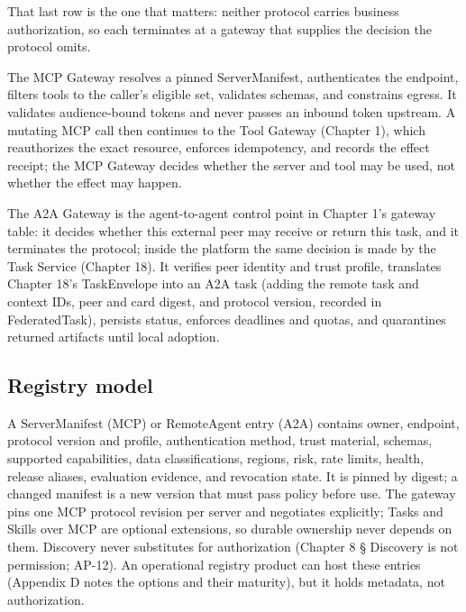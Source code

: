 That last row is the one that matters: neither protocol carries business authorization, so each terminates at a gateway that supplies the decision the protocol omits.\par

The MCP Gateway resolves a pinned ServerManifest, authenticates the endpoint, filters tools to the caller's eligible set, validates schemas, and constrains egress. It validates audience-bound tokens and never passes an inbound token upstream. A mutating MCP call then continues to the Tool Gateway (Chapter 1), which reauthorizes the exact resource, enforces idempotency, and records the effect receipt; the MCP Gateway decides whether the server and tool may be used, not whether the effect may happen.\par

The A2A Gateway is the agent-to-agent control point in Chapter 1's gateway table: it decides whether this external peer may receive or return this task, and it terminates the protocol; inside the platform the same decision is made by the Task Service (Chapter 18). It verifies peer identity and trust profile, translates Chapter 18's TaskEnvelope into an A2A task (adding the remote task and context IDs, peer and card digest, and protocol version, recorded in FederatedTask), persists status, enforces deadlines and quotas, and quarantines returned artifacts until local adoption.\par

\subsection{Registry model}

A ServerManifest (MCP) or RemoteAgent entry (A2A) contains owner, endpoint, protocol version and profile, authentication method, trust material, schemas, supported capabilities, data classifications, regions, risk, rate limits, health, release aliases, evaluation evidence, and revocation state. It is pinned by digest; a changed manifest is a new version that must pass policy before use. The gateway pins one MCP protocol revision per server and negotiates explicitly; Tasks and Skills over MCP are optional extensions, so durable ownership never depends on them. Discovery never substitutes for authorization (Chapter 8 § Discovery is not permission; AP-12). An operational registry product can host these entries (Appendix D notes the options and their maturity), but it holds metadata, not authorization.\par

